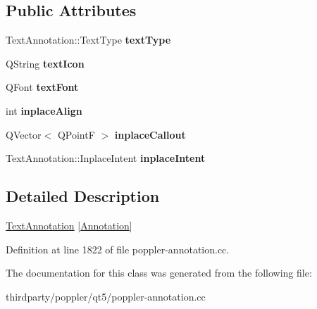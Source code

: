 \subsection*{Public Attributes}
\begin{DoxyCompactItemize}
\item 
\mbox{\label{class_poppler_1_1_text_annotation_private_abe9f78a38c97eb9cccd162f5304950ec}} 
Text\+Annotation\+::\+Text\+Type {\bfseries text\+Type}
\item 
\mbox{\label{class_poppler_1_1_text_annotation_private_ac483a8f7ceff0da74f623733f5c199cc}} 
Q\+String {\bfseries text\+Icon}
\item 
\mbox{\label{class_poppler_1_1_text_annotation_private_ab9225b4ad6c174a3ad8ebe16e7701bec}} 
Q\+Font {\bfseries text\+Font}
\item 
\mbox{\label{class_poppler_1_1_text_annotation_private_ac5e82267d53304e01dd2f672e47d848a}} 
int {\bfseries inplace\+Align}
\item 
\mbox{\label{class_poppler_1_1_text_annotation_private_acbbddf4d2824516caf8e6e47fd771d04}} 
Q\+Vector$<$ Q\+PointF $>$ {\bfseries inplace\+Callout}
\item 
\mbox{\label{class_poppler_1_1_text_annotation_private_ab154980a8c2486b3411c6a0f8fd7fce6}} 
Text\+Annotation\+::\+Inplace\+Intent {\bfseries inplace\+Intent}
\end{DoxyCompactItemize}


\subsection{Detailed Description}
\hyperlink{class_poppler_1_1_text_annotation}{Text\+Annotation} \mbox{[}\hyperlink{class_poppler_1_1_annotation}{Annotation}\mbox{]} 

Definition at line 1822 of file poppler-\/annotation.\+cc.



The documentation for this class was generated from the following file\+:\begin{DoxyCompactItemize}
\item 
thirdparty/poppler/qt5/poppler-\/annotation.\+cc\end{DoxyCompactItemize}

